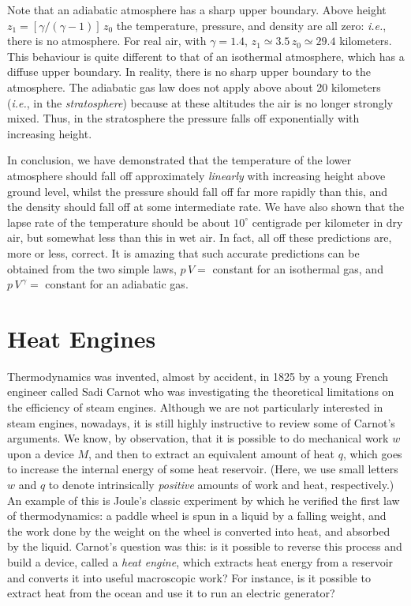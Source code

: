 Note that an adiabatic atmosphere has a sharp upper boundary. Above height
$z_1 = [\gamma/(\gamma-1)]\,z_0$ the temperature, pressure, and density are
all zero: {\em i.e.}, there is no atmosphere. For real air, with $\gamma=1.4$, 
$z_1 \simeq 3.5\,z_0 \simeq 29.4$ kilometers. This behaviour is quite different
to that of an isothermal atmosphere, which has a diffuse upper boundary. In reality,
there is no sharp upper boundary to the atmosphere. The adiabatic gas law
does not apply above about 20 kilometers ({\em i.e.}, in the {\em stratosphere}) because
at these altitudes the air is no longer strongly mixed. Thus, in the stratosphere
the pressure falls off exponentially with increasing height. 

In conclusion, we have demonstrated that the temperature 
of the lower atmosphere should fall off
approximately {\em linearly}\/ with increasing height above ground level, whilst the
pressure should fall off far more rapidly than this, and  the density should
fall off at some intermediate rate. We have also shown that the
lapse rate of the temperature should be about $10^\circ$ centigrade per kilometer
in dry air, but somewhat 
less than this in wet air. In fact, all off these predictions
are, more or less, correct. It is amazing that such accurate predictions can
be obtained from the two simple laws, $p\,V =$ constant for an isothermal gas, and
$p\,V^{\,\gamma}=$ constant for an adiabatic gas.

\section{Heat Engines}
Thermodynamics was invented, almost by accident,  in 1825 by a young French engineer
called Sadi Carnot who was investigating  the theoretical
limitations on the efficiency of
steam engines. 
Although we are not particularly interested in steam engines, nowadays, it is
still highly instructive to review  some of Carnot's arguments.
We know, by observation, that it is possible to do mechanical work $w$
upon a device $M$, and then to extract an equivalent amount of heat $q$, which
goes to increase the internal energy of some heat reservoir. (Here, we use small
letters $w$ and $q$ to denote intrinsically {\em positive}\/ amounts of work and
heat, respectively.)
 An example of this is Joule's classic experiment by which he verified
the first law of thermodynamics: a paddle wheel is spun in a liquid by a falling
weight, and the work done by  the weight on the wheel  
is converted into heat, and absorbed by the liquid. Carnot's question was
this: is it 
possible to reverse this process and build a device, called a {\em heat engine}, which
extracts heat energy from a reservoir and converts it into useful macroscopic work?
For instance,  is it possible to extract heat from the ocean and use it to run
an electric generator? 


